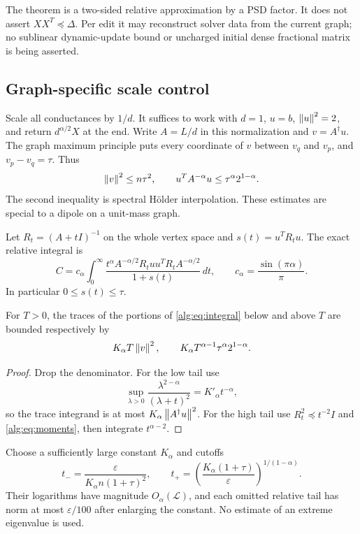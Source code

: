 The theorem is a two-sided relative approximation by a PSD factor.
It does not assert $XX^T\preceq\Delta$. Per edit it may reconstruct
solver data from the current graph; no sublinear dynamic-update bound
or uncharged initial dense fractional matrix is being asserted.

\subsection{Graph-specific scale control}
Scale all conductances by $1/d$. It suffices to work with $d=1$,
$u=b$, $\left\lVert u\right\rVert^2=2$, and return $d^{\alpha/2}X$ at the end.
Write $A=L/d$ in this normalization and $v=A^\dagger u$.
The graph maximum principle puts every coordinate of $v$ between
$v_q$ and $v_p$, and $v_p-v_q=\tau$. Thus
\begin{equation}\label{alg:eq:moments}
 \left\lVert v\right\rVert^2\le n\tau^2,\qquad
 u^TA^{-\alpha}u\le\tau^\alpha 2^{1-\alpha}.
\end{equation}
The second inequality is spectral H\"older interpolation.
These estimates are special to a dipole on a unit-mass graph.

Let $R_t=(A+tI)^{-1}$ on the whole vertex space and
$s(t)=u^TR_tu$. The exact relative integral is
\begin{equation}\label{alg:eq:integral}
 C=c_\alpha\int_0^\infty
 \frac{t^\alpha A^{-\alpha/2}R_tuu^TR_tA^{-\alpha/2}}
 {1+s(t)}\,dt,\qquad c_\alpha=\frac{\sin(\pi\alpha)}\pi.
\end{equation}
In particular $0\le s(t)\le\tau$.

\begin{lemma}
For $T>0$, the traces of the portions of \eqref{alg:eq:integral} below
and above $T$ are bounded respectively by
\[
 K_\alpha T\left\lVert v\right\rVert^2,\qquad
 K_\alpha T^{\alpha-1}\tau^\alpha2^{1-\alpha}.
\]
\end{lemma}
\begin{proof}
Drop the denominator. For the low tail use
\[
 \sup_{\lambda>0}
 \frac{\lambda^{2-\alpha}}{(\lambda+t)^2}
 =K'_\alpha t^{-\alpha},
\]
so the trace integrand is at most $K_\alpha\left\lVert A^\dagger u\right\rVert^2$.
For the high tail use $R_t^2\preceq t^{-2}I$ and
\eqref{alg:eq:moments}, then integrate $t^{\alpha-2}$.
\end{proof}

Choose a sufficiently large constant $K_\alpha$ and cutoffs
\begin{equation}\label{alg:eq:cutoff}
 t_- = \frac{\varepsilon}{K_\alpha n(1+\tau)^2},\qquad
 t_+ = \left(\frac{K_\alpha(1+\tau)}\varepsilon\right)^{1/(1-\alpha)}.
\end{equation}
Their logarithms have magnitude $O_\alpha(\mathcal L)$, and each
omitted relative tail has norm at most $\varepsilon/100$ after enlarging
the constant. No estimate of an extreme eigenvalue is used.

